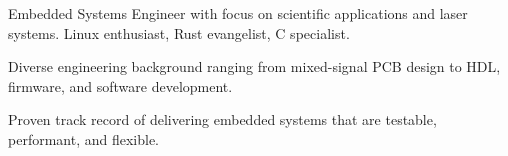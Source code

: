 

\begin{cvparagraph}

	Embedded Systems Engineer with focus on scientific applications and laser systems. \textrm{Linux} enthusiast, \textrm{Rust} evangelist, \textrm{C} specialist.

	Diverse engineering background ranging from mixed-signal PCB design to \textrm{HDL}, firmware, and software development.

	Proven track record of delivering embedded systems that are testable, performant, and flexible.
\end{cvparagraph}
